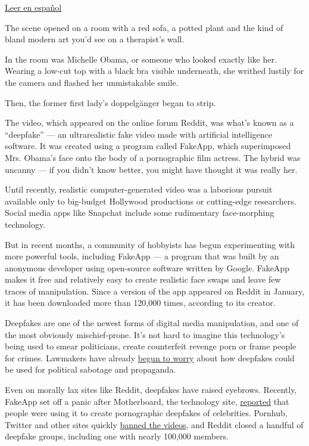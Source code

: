 \href{https://www.nytimes.com/es/2018/03/07/noticias-falsas-videomontajes-deepfake-fakeapp/}{Leer
en español}

The scene opened on a room with a red sofa, a potted plant and the kind
of bland modern art you'd see on a therapist's wall.

In the room was Michelle Obama, or someone who looked exactly like her.
Wearing a low-cut top with a black bra visible underneath, she writhed
lustily for the camera and flashed her unmistakable smile.

Then, the former first lady's doppelgänger began to strip.

The video, which appeared on the online forum Reddit, was what's known
as a ``deepfake'' --- an ultrarealistic fake video made with artificial
intelligence software. It was created using a program called FakeApp,
which superimposed Mrs. Obama's face onto the body of a pornographic
film actress. The hybrid was uncanny --- if you didn't know better, you
might have thought it was really her.

Until recently, realistic computer-generated video was a laborious
pursuit available only to big-budget Hollywood productions or
cutting-edge researchers. Social media apps like Snapchat include some
rudimentary face-morphing technology.

But in recent months, a community of hobbyists has begun experimenting
with more powerful tools, including FakeApp --- a program that was built
by an anonymous developer using open-source software written by Google.
FakeApp makes it free and relatively easy to create realistic face swaps
and leave few traces of manipulation. Since a version of the app
appeared on Reddit in January, it has been downloaded more than 120,000
times, according to its creator.

Deepfakes are one of the newest forms of digital media manipulation, and
one of the most obviously mischief-prone. It's not hard to imagine this
technology's being used to smear politicians, create counterfeit revenge
porn or frame people for crimes. Lawmakers have already
\href{http://thehill.com/policy/technology/374320-lawmakers-worry-about-rise-of-fake-video-technology}{begun
to worry} about how deepfakes could be used for political sabotage and
propaganda.

Even on morally lax sites like Reddit, deepfakes have raised eyebrows.
Recently, FakeApp set off a panic after Motherboard, the technology
site,
\href{https://motherboard.vice.com/en_us/article/gydydm/gal-gadot-fake-ai-porn}{reported}
that people were using it to create pornographic deepfakes of
celebrities. Pornhub, Twitter and other sites quickly
\href{http://variety.com/2018/digital/news/reddit-twitter-deepfake-ban-1202690627/}{banned
the videos}, and Reddit closed a handful of deepfake groups, including
one with nearly 100,000 members.

